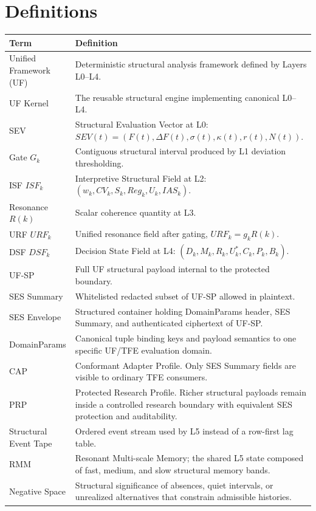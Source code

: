\documentclass[11pt]{report}
\begin{document}
\section{Definitions}
\begin{longtable}{p{}p{}}
\toprule
Term & Definition \\
\midrule
Unified Framework (UF) & Deterministic structural analysis framework defined by Layers L0--L4. \\
UF Kernel & The reusable structural engine implementing canonical L0--L4. \\
SEV & Structural Evaluation Vector at L0: $SEV(t)=(F(t),\Delta F(t),\sigma(t),\kappa(t),r(t),N(t))$. \\
Gate $G_k$ & Contiguous structural interval produced by L1 deviation thresholding. \\
ISF $ISF_k$ & Interpretive Structural Field at L2: $(w_k,CV_k,S_k,Reg_k,U_k,IAS_k)$. \\
Resonance $R(k)$ & Scalar coherence quantity at L3. \\
URF $URF_k$ & Unified resonance field after gating, $URF_k=g_kR(k)$. \\
DSF $DSF_k$ & Decision State Field at L4: $(D_k,M_k,R_k,U_k^{\ast},C_k,P_k,B_k)$. \\
UF-SP & Full UF structural payload internal to the protected boundary. \\
SES Summary & Whitelisted redacted subset of UF-SP allowed in plaintext. \\
SES Envelope & Structured container holding DomainParams header, SES Summary, and authenticated ciphertext of UF-SP. \\
DomainParams & Canonical tuple binding keys and payload semantics to one specific UF/TFE evaluation domain. \\
CAP & Conformant Adapter Profile. Only SES Summary fields are visible to ordinary TFE consumers. \\
PRP & Protected Research Profile. Richer structural payloads remain inside a controlled research boundary with equivalent SES protection and auditability. \\
Structural Event Tape & Ordered event stream used by L5 instead of a row-first lag table. \\
RMM & Resonant Multi-scale Memory; the shared L5 state composed of fast, medium, and slow structural memory bands. \\
Negative Space & Structural significance of absences, quiet intervals, or unrealized alternatives that constrain admissible histories. \\

\end{longtable}
\end{document}
